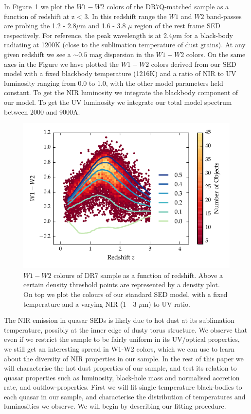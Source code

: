 In Figure~\ref{fig:w1w2colorsratio} we plot the $W1 - W2$ colors of the DR7Q-matched sample as a function of redshift at z < 3. 
In this redshift range the $W1$ and $W2$ band-passes are probing the 1.2 - 2.8$\mu$m and 1.6 - 3.8 $\mu$ region of the rest frame SED respectively. 
For reference, the peak wavelength is at 2.4$\mu$m for a black-body radiating at 1200K (close to the sublimation temperature of dust grains). 
At any given redshift we see a $\sim 0.5$ mag dispersion in the $W1-W2$ colors. 
On the same axes in the Figure we have plotted the $W1 - W2$ colors derived from our SED model with a fixed blackbody temperature (1216K) and a ratio of NIR to UV luminosity ranging from 0.0 to 1.0, with the other model parameters held constant. 
To get the NIR luminosity we integrate the blackbody component of our model. 
To get the UV luminosity we integrate our total model spectrum between 2000 and 9000A.  

\begin{figure}
\centering
\includegraphics[width=\columnwidth]{figures/chapter06/w1w2_versus_redshift_ratio.pdf}
\caption{$W1 - W2$ colours of DR7 sample as a function of redshift. Above a certain density threshold points are represented by a density plot. On top we plot the colours of our standard SED model, with a fixed temperature and a varying NIR (1 - 3 $\mu$m) to UV ratio. }
  \label{fig:w1w2colorsratio}
\end{figure}

The NIR emission in quasar SEDs is likely due to hot dust at its sublimation temperature, possibly at the inner edge of dusty torus structure. 
We observe that even if we restrict the sample to be fairly uniform in its UV/optical properties, we still get an interesting spread in W1-W2 colors, which we can use to learn about the diversity of NIR properties in our sample. In the rest of this paper we will characterise the hot dust properties of our sample, and test its relation to quasar properties such as luminosity, black-hole mass and normalised accretion rate, and outflow-properties. 
First we will fit single temperature black-bodies to each quasar in our sample, and characterise the distribution of temperatures and luminosities we observe. 
We will begin by describing our fitting procedure. 

